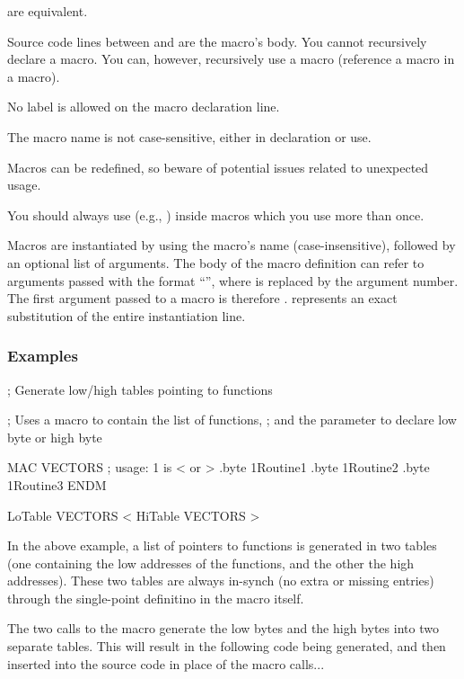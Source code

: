 	 are equivalent.

	
	Source code lines between  and  are the macro's body.
	You cannot recursively declare a macro.  You can, however, recursively
	use a macro (reference a macro in a macro).
		
No label is allowed on the macro declaration line.

The macro name is not case-sensitive, either in declaration or use.

Macros can be redefined, so beware of potential issues related to unexpected usage.

You should always use  (e.g., ) inside macros which you use
more than once.
	
Macros are instantiated by using the macro's name (case-insensitive), followed by an optional list of arguments. The body of the macro definition can refer to arguments passed with the format ``\mono{\{\#\}}'', where \mono{\#} is replaced by the argument number. The first argument passed to a macro is therefore .  represents an exact substitution of the entire instantiation line.
	
	\subsubsection{Examples}
	
\begin{code}[caption=Vector Table Generation using a MACRO]
; Generate low/high tables pointing to functions

; Uses a macro to contain the list of functions,
; and the parameter to declare low byte or high byte
	
  MAC VECTORS
  ; usage: {1} is < or >
    .byte {1}Routine1
    .byte {1}Routine2
    .byte {1}Routine3
  ENDM
	
LoTable VECTORS <
HiTable VECTORS > 
\end{code}
	
In the above example, a list of pointers to functions is generated in two tables (one containing the low addresses of the functions, and the other the high addresses). These two tables are always in-synch (no extra or missing entries) through the single-point definitino in the macro itself.

The two calls to the macro generate the low bytes and the high bytes into two separate tables. This will result in the following code being generated, and then inserted into the source code in place of the macro calls...
	
